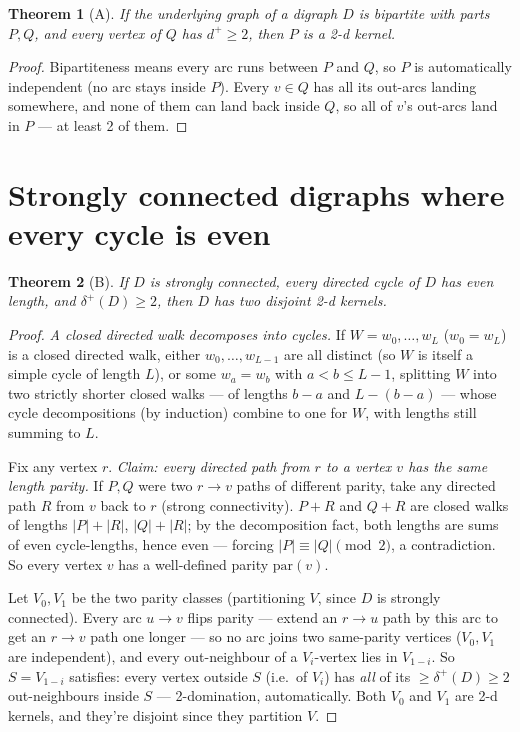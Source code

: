 \documentclass[11pt]{article}
\theoremstyle{plain}
\newtheorem{theorem}{Theorem}
\theoremstyle{definition}
\theoremstyle{remark}
\begin{document}
\begin{theorem}[A]
If the underlying graph of a digraph $D$ is bipartite with parts $P, Q$, and every
vertex of $Q$ has $d^+ \ge 2$, then $P$ is a 2-d kernel.
\end{theorem}

\begin{proof}
Bipartiteness means every arc runs between $P$ and $Q$, so $P$ is automatically
independent (no arc stays inside $P$). Every $v \in Q$ has all its out-arcs landing
somewhere, and none of them can land back inside $Q$, so all of $v$'s out-arcs land
in $P$ — at least 2 of them.
\end{proof}

\section{Strongly connected digraphs where every cycle is even}

\begin{theorem}[B]
If $D$ is strongly connected, every directed cycle of $D$ has even length, and
$\delta^+(D) \ge 2$, then $D$ has two disjoint 2-d kernels.
\end{theorem}

\begin{proof}
\emph{A closed directed walk decomposes into cycles.} If $W = w_0,\dots,w_L$
($w_0=w_L$) is a closed directed walk, either $w_0,\dots,w_{L-1}$ are all distinct (so
$W$ is itself a simple cycle of length $L$), or some $w_a = w_b$ with $a<b\le L-1$,
splitting $W$ into two strictly shorter closed walks — of lengths $b-a$ and
$L-(b-a)$ — whose cycle decompositions (by induction) combine to one for $W$, with
lengths still summing to $L$.

Fix any vertex $r$. \emph{Claim: every directed path from $r$ to a vertex $v$ has the
same length parity.} If $P, Q$ were two $r\to v$ paths of different parity, take any
directed path $R$ from $v$ back to $r$ (strong connectivity). $P{+}R$ and $Q{+}R$ are
closed walks of lengths $|P|{+}|R|$, $|Q|{+}|R|$; by the decomposition fact, both
lengths are sums of even cycle-lengths, hence even — forcing $|P|\equiv|Q|\pmod 2$,
a contradiction. So every vertex $v$ has a well-defined parity $\mathrm{par}(v)$.

Let $V_0, V_1$ be the two parity classes (partitioning $V$, since $D$ is strongly
connected). Every arc $u\to v$ flips parity — extend an $r\to u$ path by this arc to
get an $r\to v$ path one longer — so no arc joins two same-parity vertices ($V_0,
V_1$ are independent), and every out-neighbour of a $V_i$-vertex lies in $V_{1-i}$.
So $S=V_{1-i}$ satisfies: every vertex outside $S$ (i.e.\ of $V_i$) has \emph{all} of
its $\ge\delta^+(D)\ge2$ out-neighbours inside $S$ — 2-domination, automatically. Both
$V_0$ and $V_1$ are 2-d kernels, and they're disjoint since they partition $V$.
\end{proof}
\end{document}
